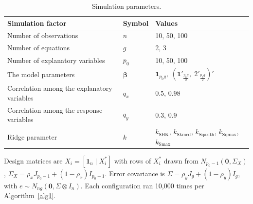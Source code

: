 \documentclass[twoside]{article}
\begin{document}
\begin{table}[htbp]
\centering
\caption{Simulation parameters.}
\label{tab:sim_params}
\begin{tabular}{|l|l|l|}
\hline
Simulation factor & Symbol & Values \\
\hline
Number of observations & $n$ & 10, 50, 100 \\
Number of equations & $g$ & 2, 3 \\
Number of explanatory variables & $p_0$ & 10, 50, 100 \\
The model parameters & $\boldsymbol{\beta}$ & $\mathbf{1}_{p_0 g},\; (\mathbf{1}'_{\frac{p_0 g}{2}},\; 2'_{\frac{p_0 g}{2}})'$ \\
Correlation among the explanatory variables & $q_x$ & 0.5, 0.98 \\
Correlation among the response variables & $q_y$ & 0.3, 0.9 \\
Ridge parameter & $k$ & $k_{\mathrm{SHK}}$, $k_{\mathrm{Skmed}}$, $k_{\mathrm{Sqarith}}$, $k_{\mathrm{Sqmax}}$, $k_{\mathrm{Smax}}$ \\
\hline
\end{tabular}
\end{table}

Design matrices are $X_i = [\mathbf{1}_n \mid X^*_i]$ with rows of $X^*_i$ drawn from $N_{p_0-1}(\mathbf{0},\Sigma_X)$, $\Sigma_X = \rho_x J_{p_0-1} + (1-\rho_x)I_{p_0-1}$. Error covariance is $\Sigma = \rho_y J_g + (1-\rho_y)I_g$, with $e \sim N_{ng}(\mathbf{0}, \Sigma \otimes I_n)$. Each configuration ran 10,000 times per Algorithm~\ref{alg1}.
\end{document}
